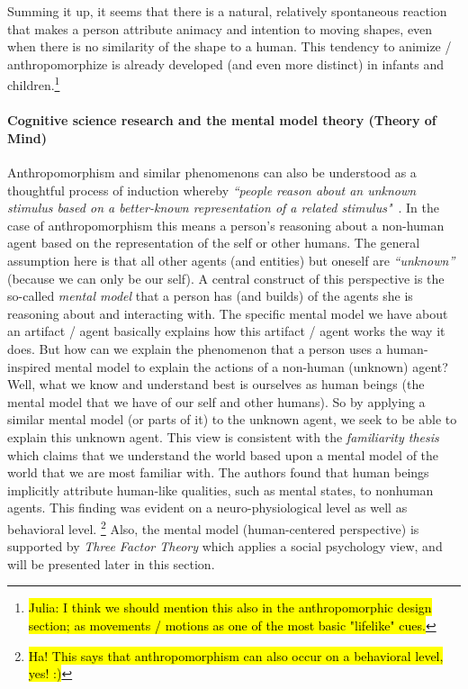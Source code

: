 \documentclass{frontiersSCNS} %
\begin{document}
Summing it up, it seems that there is a natural, relatively spontaneous reaction that makes a person attribute animacy and intention to moving shapes, even when there is no similarity of the shape to a human. This tendency to animize / anthropomorphize is already developed (and even more distinct) in infants and children.\footnote{\hl{Julia: I think we should mention this also in the anthropomorphic design section; as movements / motions as one of the most basic "lifelike" cues.}}


\paragraph*{Cognitive science research and the mental model theory (Theory of Mind)\\}

Anthropomorphism and similar phenomenons can also be understood as a thoughtful process of induction whereby \textit{``people reason about an unknown stimulus based on a better-known representation of a related stimulus"}~\citep{epley_when_2008}. In the case of anthropomorphism this means a person's reasoning about a non-human agent based on the representation of the self or other humans. The general assumption here is that all other agents (and entities) but oneself are \textit{``unknown''} (because we can only be our self). A central construct of this perspective is the so-called \textit{mental model} that a person has (and builds) of the agents she is reasoning about and interacting with. The specific mental model we have about an artifact / agent basically explains how this artifact / agent works the way it does. But how can we explain the phenomenon that a person uses a human-inspired mental model to explain the actions of a non-human (unknown) agent? Well, what we know and understand best is ourselves as human beings (the mental model that we have of our self and other humans). So by applying a similar mental model (or parts of it) to the unknown agent, we seek to be able to explain this unknown agent.
This view is consistent with the \emph{familiarity thesis}~\citep{hegel_understanding_2008} which claims that we understand the world based upon a mental model of the world that we are most familiar with. The authors found that human beings implicitly attribute human-like qualities, such as mental states, to nonhuman agents. This finding was evident on a neuro-physiological level as well as behavioral level. \footnote{\hl{Ha! This says that anthropomorphism can also occur on a behavioral level, yes! :)}} Also, the mental model (human-centered perspective) is supported by \cite{epley_seeing_2007} \textit{Three Factor Theory} which applies a social psychology view, and will be presented later in this section.
\end{document}
